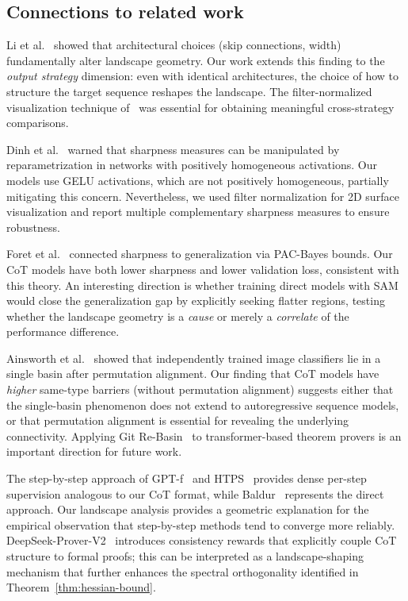 \subsection{Connections to related work}\label{subsec:related}

Li et al.~\cite{li2018visualizing} showed that architectural choices (skip
connections, width) fundamentally alter landscape geometry. Our work extends
this finding to the \emph{output strategy} dimension: even with identical
architectures, the choice of how to structure the target sequence reshapes the
landscape. The filter-normalized visualization technique of~\cite{li2018visualizing}
was essential for obtaining meaningful cross-strategy comparisons.

Dinh et al.~\cite{dinh2017sharp} warned that sharpness measures can be
manipulated by reparametrization in networks with positively homogeneous
activations. Our models use GELU activations, which are not positively
homogeneous, partially mitigating this concern. Nevertheless, we used
filter normalization for 2D surface visualization and report multiple
complementary sharpness measures to ensure robustness.

Foret et al.~\cite{foret2021sharpness} connected sharpness to generalization
via PAC-Bayes bounds. Our CoT models have both lower sharpness and lower
validation loss, consistent with this theory. An interesting direction is
whether training direct models with SAM would close the generalization gap by
explicitly seeking flatter regions, testing whether the landscape geometry is
a \emph{cause} or merely a \emph{correlate} of the performance difference.

Ainsworth et al.~\cite{ainsworth2023git} showed that independently trained
image classifiers lie in a single basin after permutation alignment.  Our
finding that CoT models have \emph{higher} same-type barriers (without
permutation alignment) suggests either that the single-basin phenomenon does
not extend to autoregressive sequence models, or that permutation alignment is
essential for revealing the underlying connectivity. Applying Git
Re-Basin~\cite{ainsworth2023git} to transformer-based theorem provers is an
important direction for future work.

The step-by-step approach of GPT-f~\cite{polu2020generative} and
HTPS~\cite{lample2022hypertree} provides dense per-step supervision analogous
to our CoT format, while Baldur~\cite{first2023baldur} represents the direct
approach. Our landscape analysis provides a geometric explanation for the
empirical observation that step-by-step methods tend to converge more reliably.
DeepSeek-Prover-V2~\cite{ren2025deepseek} introduces consistency rewards that
explicitly couple CoT structure to formal proofs; this can be interpreted as a
landscape-shaping mechanism that further enhances the spectral orthogonality
identified in Theorem~\ref{thm:hessian-bound}.

